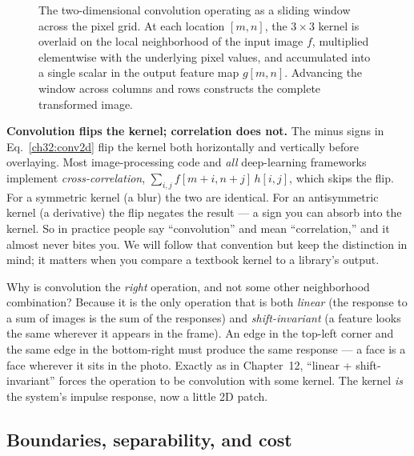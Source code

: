 \begin{figure}[H]
\caption{The two-dimensional convolution operating as a sliding window across the pixel grid. At each location $[m,n]$, the $3\times3$ kernel is overlaid on the local neighborhood of the input image $f$, multiplied elementwise with the underlying pixel values, and accumulated into a single scalar in the output feature map $g[m,n]$. Advancing the window across columns and rows constructs the complete transformed image.}
\label{ch32:fig-conv-overlay}
\end{figure}

\begin{trapbox}
\textbf{Convolution flips the kernel; correlation does not.} The minus signs in
Eq.~\eqref{ch32:conv2d} flip the kernel both horizontally and vertically before
overlaying. Most image-processing code and \emph{all} deep-learning frameworks
implement \emph{cross-correlation},
$\sum_{i,j} f[m+i,n+j]\,h[i,j]$, which skips the flip. For a symmetric kernel
(a blur) the two are identical. For an antisymmetric kernel (a derivative) the
flip negates the result --- a sign you can absorb into the kernel. So in
practice people say ``convolution'' and mean ``correlation,'' and it almost
never bites you. We will follow that convention but keep the distinction in
mind; it matters when you compare a textbook kernel to a library's output.
\end{trapbox}

\begin{whybox}
Why is convolution the \emph{right} operation, and not some other neighborhood
combination? Because it is the only operation that is both \emph{linear} (the
response to a sum of images is the sum of the responses) and
\emph{shift-invariant} (a feature looks the same wherever it appears in the
frame). An edge in the top-left corner and the same edge in the bottom-right
must produce the same response --- a face is a face wherever it sits in the
photo. Exactly as in Chapter~12, ``linear + shift-invariant'' forces the
operation to be convolution with some kernel. The kernel \emph{is} the system's
impulse response, now a little 2D patch.
\end{whybox}

\subsection{Boundaries, separability, and cost}

